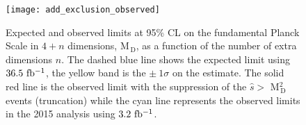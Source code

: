 \begin{figure}[!h]
  \centering
  \texttt{[image: add\_exclusion\_observed]}
  \caption{Expected and observed limits at 95\% CL on the fundamental Planck
    Scale in $4 + n$ dimensions, M$_\mathrm{\, D}$, as a function of the number
    of extra dimensions $n$. The dashed blue line shows the expected limit using
    $36.5~\mbox{fb$^{-1}$}$, the yellow band is the $\pm~1\sigma$ on the estimate. The solid
    red line is the observed limit with the suppression of the $\hat{s} >$
    M$_\mathrm{\, D}^2$ events (truncation) while the cyan line represents the
    observed limits in the 2015 analysis using $3.2~\mbox{fb$^{-1}$}$.}
  \label{fig:add_observed}
\end{figure}

